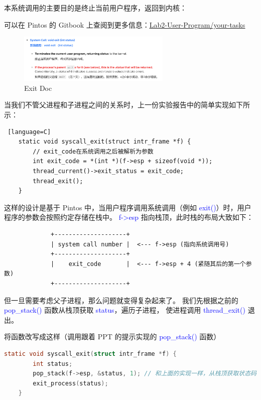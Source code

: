 \documentclass[14pt,a4paper,UTF8,twoside]{article}
\renewcommand{\texttt}[1]{\textcolor{blue}{\ttfamily #1}}
\begin{document}
本系统调用的主要目的是终止当前用户程序，返回到内核：

可以在 Pintos 的 Gitbook 上查阅到更多信息：\href{https://pkuflyingpig.gitbook.io/pintos/project-description/lab2-user-programs/your-tasks}{\underline{Lab2-User-Program/your-tasks}}

\begin{figure}[H]
    \centering
    \includegraphics[width=0.65\textwidth]{img6/exit.png}
    \caption{Exit Doc}
    \label{fig:exit}
\end{figure}

当我们不管父进程和子进程之间的关系时，上一份实验报告中的简单实现如下所示：

\begin{lstlisting} [language=C]
    static void syscall_exit(struct intr_frame *f) {
        // exit_code在系统调用之后被解析为参数
        int exit_code = *(int *)(f->esp + sizeof(void *));
        thread_current()->exit_status = exit_code;
        thread_exit();
    }
\end{lstlisting}

这样的设计是基于 Pintos 中，当用户程序调用系统调用（例如 \texttt{exit()}）时，用户程序的参数会按照约定存储在栈中。
\texttt{f->esp} 指向栈顶，此时栈的布局大致如下：

\begin{lstlisting}
             +--------------------+
             | system call number |  <--- f->esp (指向系统调用号)
             +--------------------+
             |    exit_code       |  <--- f->esp + 4 (紧随其后的第一个参数)
             +--------------------+    
\end{lstlisting}

但一旦需要考虑父子进程，那么问题就变得复杂起来了。
我们先根据之前的 \texttt{pop\_stack()} 函数从栈顶获取 \texttt{status}，遍历子进程，
使进程调用 \texttt{thread\_exit()} 退出。

将函数改写成这样（调用跟着 PPT 的提示实现的 \texttt{pop\_stack()} 函数）

\begin{lstlisting}[language=C, title= syscall\_exit()]
    static void syscall_exit(struct intr_frame *f) {
        int status;
        pop_stack(f->esp, &status, 1); // 和上面的实现一样，从栈顶获取状态码
        exit_process(status);
    }
\end{lstlisting}
\end{document}
